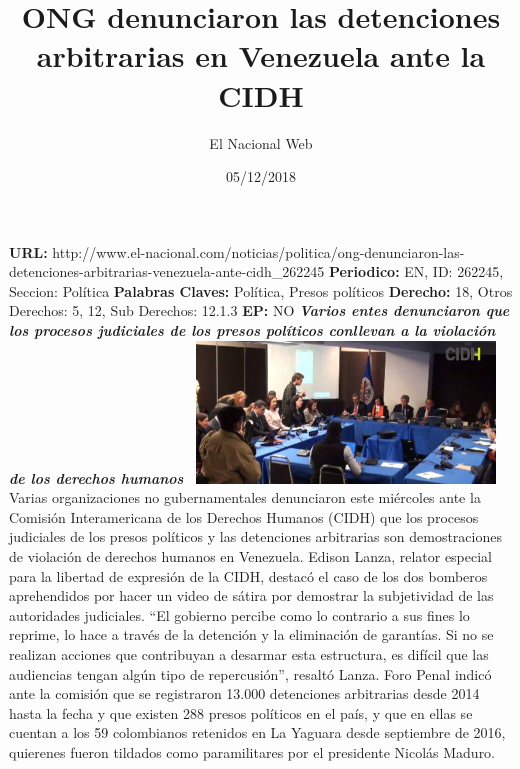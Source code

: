 \documentclass{article}%
\title{\textbf{ONG denunciaron las detenciones arbitrarias en Venezuela ante la CIDH}}%
\author{El Nacional Web}%
\date{05/12/2018}%
\begin{document}
%
\normalsize%
\maketitle%
\textbf{URL: }%
http://www.el{-}nacional.com/noticias/politica/ong{-}denunciaron{-}las{-}detenciones{-}arbitrarias{-}venezuela{-}ante{-}cidh\_262245\newline%
%
\textbf{Periodico: }%
EN, %
ID: %
262245, %
Seccion: %
Política\newline%
%
\textbf{Palabras Claves: }%
Política, Presos políticos\newline%
%
\textbf{Derecho: }%
18, %
Otros Derechos: %
5, 12, %
Sub Derechos: %
12.1.3\newline%
%
\textbf{EP: }%
NO\newline%
\newline%
%
\textbf{\textit{Varios entes denunciaron que los procesos judiciales de los presos políticos conllevan a la violación de los derechos humanos~}}%
\newline%
\newline%
%
\includegraphics[width=300px]{27.jpg}%
\newline%
%
Varias organizaciones no gubernamentales denunciaron este miércoles ante la Comisión Interamericana de los Derechos Humanos (CIDH) que los procesos judiciales de los presos políticos y las detenciones arbitrarias son demostraciones de violación de derechos humanos en Venezuela.%
\newline%
%
Edison Lanza, relator especial para la libertad de expresión de la CIDH, destacó el caso de los dos bomberos aprehendidos por hacer un video de sátira por demostrar la subjetividad de las autoridades judiciales.%
\newline%
%
“El gobierno percibe como lo contrario a sus fines lo reprime, lo hace a través de la detención y la eliminación de garantías. Si no se realizan acciones que contribuyan a desarmar esta estructura, es difícil que las audiencias tengan algún tipo de repercusión”, resaltó Lanza.%
\newline%
%
Foro Penal indicó ante la comisión que se registraron 13.000 detenciones arbitrarias desde 2014 hasta la fecha y que existen 288 presos políticos en el país, y que en ellas se cuentan a los 59 colombianos retenidos en La Yaguara desde septiembre de 2016, quierenes fueron tildados como paramilitares por el presidente Nicolás Maduro.%
\end{document}
